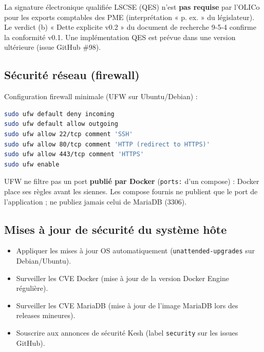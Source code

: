 \documentclass[a4paper,11pt,oneside]{article}
\begin{document}
\begin{keshnote}
La signature électronique qualifiée LSCSE (QES) n'est \textbf{pas requise} par l'OLICo pour les exports comptables des PME (interprétation « p. ex. » du législateur). Le verdict (b) « Dette explicite v0.2 » du document de recherche 9-5-4 confirme la conformité v0.1. Une implémentation QES est prévue dans une version ultérieure (issue GitHub \#98).
\end{keshnote}

\subsection{Sécurité réseau (firewall)}\label{sec:firewall}

Configuration firewall minimale (UFW sur Ubuntu/Debian) :

\begin{lstlisting}[language=bash]
sudo ufw default deny incoming
sudo ufw default allow outgoing
sudo ufw allow 22/tcp comment 'SSH'
sudo ufw allow 80/tcp comment 'HTTP (redirect to HTTPS)'
sudo ufw allow 443/tcp comment 'HTTPS'
sudo ufw enable
\end{lstlisting}

\begin{keshwarning}
UFW ne filtre pas un port \textbf{publié par Docker} (\texttt{ports:} d'un compose) : Docker place ses règles avant les siennes. Les compose fournis ne publient que le port de l'application ; ne publiez jamais celui de MariaDB (3306).
\end{keshwarning}

\subsection{Mises à jour de sécurité du système hôte}

\begin{itemize}
    \item Appliquer les mises à jour OS automatiquement (\texttt{unattended-upgrades} sur Debian/Ubuntu).
    \item Surveiller les CVE Docker (mise à jour de la version Docker Engine régulière).
    \item Surveiller les CVE MariaDB (mise à jour de l'image MariaDB lors des releases mineures).
    \item Souscrire aux annonces de sécurité Kesh (label \texttt{security} sur les issues GitHub).
\end{itemize}

\end{document}
